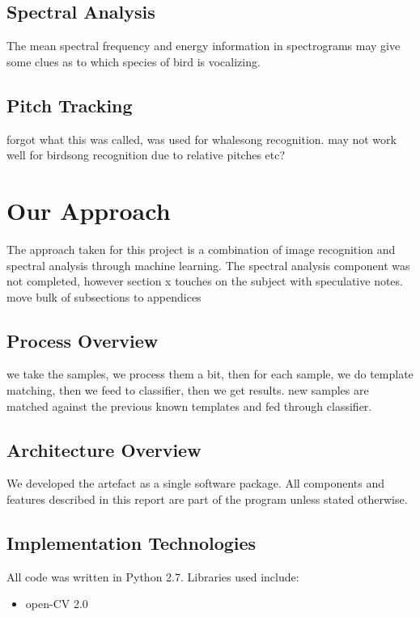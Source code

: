 \subsection{Spectral Analysis}
The mean spectral frequency and energy information in spectrograms may give some
clues as to which species of bird is vocalizing.

\subsection{Pitch Tracking}
forgot what this was called, was used for whalesong recognition.
may not work well for birdsong recognition due to relative pitches etc?

\section{Our Approach}
The approach taken for this project is a combination of image recognition and
spectral analysis through machine learning.
The spectral analysis component was not completed, however section x touches on
the subject with speculative notes.\\

move bulk of subsections to appendices

\subsection{Process Overview}
we take the samples, we process them a bit, then for each sample, we do template
matching, then we feed to classifier, then we get results. new samples are
matched against the previous known templates and fed through classifier.

\subsection{Architecture Overview}
We developed the artefact as a single software package.
All components and features described in this report are part of the program
unless stated otherwise.

\subsection{Implementation Technologies}
All code was written in Python 2.7.
Libraries used include:
\begin{itemize}
  \item open-CV 2.0
\end{itemize}
